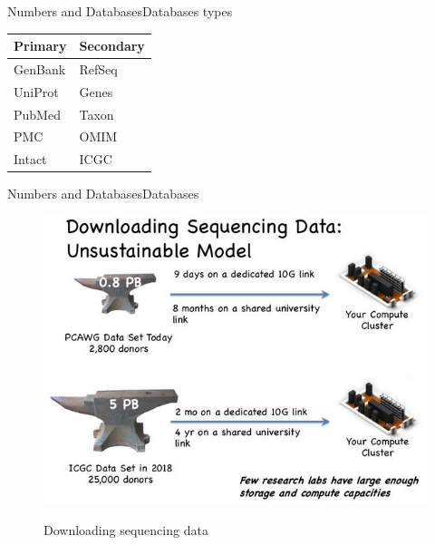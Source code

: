 \documentclass[10pt]{beamer}
\begin{document}
{%
\begin{frame}{Numbers and Databases}{Databases types}
\centering
\begin{tabular}{ll}
\textbf{Primary} & \textbf{Secondary}                                \\
\hline
GenBank    & RefSeq    \\
UniProt    & Genes  \\
PubMed    & Taxon  \\
PMC    & OMIM  \\
Intact & ICGC \\
\end{tabular}

\end{frame}


\begin{frame}{Numbers and Databases}{Databases}
\begin{figure}[]
 \centering
    \includegraphics[width=\textwidth,height=0.7\textheight,keepaspectratio]{img/numbers/dat.jpg}
    \label{img:mot2}
    \caption{Downloading sequencing data}
\end{figure}
\end{frame}

}
\end{document}
